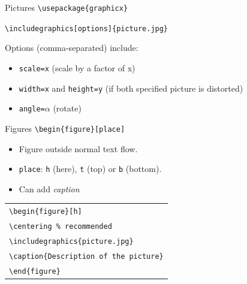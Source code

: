\documentclass[11pt]{beamer}
\newcommand{\bs}{\textbackslash}
\begin{document}
\begin{frame}{Pictures}
  \texttt{\bs usepackage\{graphicx\}} 

  \texttt{\bs includegraphics[options]\{picture.jpg\}} 

  \vspace{1cm}
  Options (comma-separated) include:

  \vspace{0.2cm}
  \begin{itemize}
    \item \texttt{scale=x} (scale by a factor of x)
    \item \texttt{width=x} and \texttt{height=y} (if both specified picture
          is distorted)
    \item \texttt{angle=$\alpha$} (rotate)
  \end{itemize}
\end{frame}


\begin{frame}{Figures}
  \texttt{\bs begin\{figure\}[place]}
  
  \vspace{1cm}
  \begin{itemize}
    \item Figure outside normal text flow.
    \item \texttt{place}: \texttt{h} (here), \texttt{t} (top) or \texttt{b}
          (bottom).
    \item Can add \emph{caption}
  \end{itemize}

  \vspace{0.3cm}
  \begin{center} \begin{tabular}{l}
    \texttt{\bs begin\{figure\}[h]} \\
    \texttt{\qquad\bs centering \qquad \% recommended} \\
    \texttt{\qquad \bs includegraphics\{picture.jpg\}} \\
    \texttt{\qquad \bs caption\{Description of the picture\}} \\
    \texttt{\bs end\{figure\}}
  \end{tabular} \end{center}
\end{frame}
\end{document}
